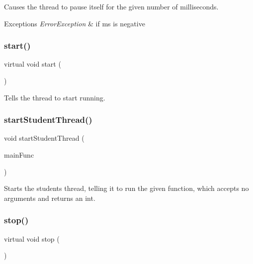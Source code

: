 Causes the thread to pause itself for the given number of milliseconds. 


\begin{DoxyExceptions}{Exceptions}
{\em Error\+Exception} & if ms is negative \\
\hline
\end{DoxyExceptions}
\mbox{\label{classGThread_ac0ae5f26cd2001d772aed9d2ea97d41c}} 
\subsubsection{\texorpdfstring{start()}{start()}}
{\footnotesize\ttfamily virtual void start (\begin{DoxyParamCaption}{ }\end{DoxyParamCaption})\hspace{0.3cm}{\ttfamily [pure virtual]}}



Tells the thread to start running. 

\mbox{\label{classGThread_a7d68a5d8a6557bb824cf2568240a1aef}} 
\subsubsection{\texorpdfstring{start\+Student\+Thread()}{startStudentThread()}}
{\footnotesize\ttfamily void start\+Student\+Thread (\begin{DoxyParamCaption}\item[{G\+Thunk\+Int}]{main\+Func }\end{DoxyParamCaption})\hspace{0.3cm}{\ttfamily [static]}}



Starts the student\textquotesingle{}s thread, telling it to run the given function, which accepts no arguments and returns an int. 

\mbox{\label{classGThread_a0efff8623a2fb79dad94a96dcf16d966}} 
\subsubsection{\texorpdfstring{stop()}{stop()}}
{\footnotesize\ttfamily virtual void stop (\begin{DoxyParamCaption}{ }\end{DoxyParamCaption})\hspace{0.3cm}{\ttfamily [pure virtual]}}



